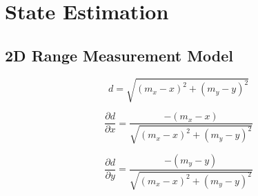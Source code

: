 \chapter{State Estimation}

\section{2D Range Measurement Model}

\begin{equation}
  \boxed{
    d = \sqrt{(m_x - x)^2 + (m_y - y)^2}
  }
\end{equation}

\begin{equation}
  \boxed{
    \dfrac{\partial d}{\partial x}
      = \dfrac{-(m_x - x)}{\sqrt{(m_x - x)^2 + (m_y - y)^2}}
  }
\end{equation}

\begin{equation}
  \boxed{
    \dfrac{\partial d}{\partial y}
      = \dfrac{-(m_y - y)}{\sqrt{(m_x - x)^2 + (m_y - y)^2}}
  }
\end{equation}

